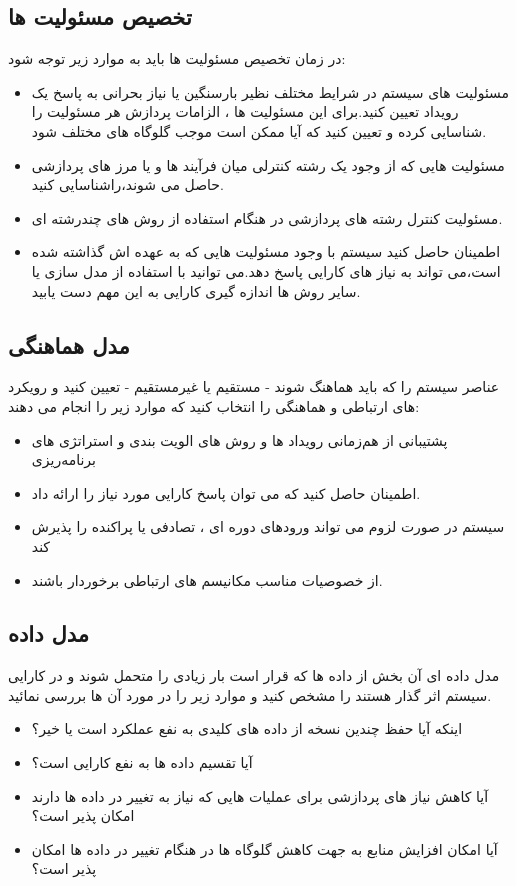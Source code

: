 \subsection{تخصیص مسئولیت ها} 
در زمان تخصیص مسئولیت ها باید  به موارد زیر توجه شود:
\begin{itemize}
\item
مسئولیت های سیستم در شرایط مختلف نظیر بارسنگین  یا نیاز بحرانی به پاسخ یک رویداد تعیین کنید.برای این مسئولیت ها ، الزامات پردازش هر مسئولیت را شناسایی کرده و تعیین کنید که آیا ممکن است موجب گلوگاه های مختلف شود.
\item
مسئولیت هایی که از وجود یک رشته کنترلی میان فرآیند ها و یا مرز های پردازشی حاصل می شوند،‌راشناسایی کنید.
\item
مسئولیت کنترل رشته های پردازشی در هنگام استفاده از روش های چند‌رشته ای.
\item
اطمینان حاصل کنید سیستم با وجود مسئولیت هایی که به عهده اش گذاشته شده است،‌می تواند به نیاز های کارایی پاسخ دهد.می توانید با استفاده از مدل سازی یا سایر روش ها اندازه گیری کارایی به این مهم دست یابید.
\end{itemize}
\subsection{مدل هماهنگی}
عناصر سیستم را که باید هماهنگ شوند - مستقیم یا غیرمستقیم - تعیین کنید و رویکرد های ارتباطی و هماهنگی را انتخاب کنید که موارد زیر را انجام می دهند:
\begin{itemize}
\item
پشتیبانی از هم‌زمانی رویداد ها و روش های الویت بندی و استراتژی های برنامه‌ریزی
\item
اطمینان حاصل کنید که می توان پاسخ کارایی مورد نیاز را ارائه داد.
\item
سیستم در صورت لزوم می تواند ورودهای دوره ای ، تصادفی یا پراکنده را پذیرش کند
\item
از خصوصیات مناسب مکانیسم های ارتباطی برخوردار باشند.
\end{itemize}
\subsection{مدل داده}
مدل داده   ای آن بخش از داده ها که قرار است بار زیادی را متحمل شوند و در کارایی سیستم اثر گذار هستند را مشخص کنید و موارد زیر را در مورد آن ها بررسی نمائید.
\begin{itemize}
\item
اینکه آیا حفظ چندین نسخه از داده های کلیدی به نفع عملکرد است یا خیر؟
\item
آیا تقسیم داده ها به نفع کارایی است؟
\item
آیا کاهش نیاز های پردازشی برای عملیات هایی که نیاز به تغییر در داده ها دارند امکان پذیر است؟
\item
آیا امکان افزایش منابع به جهت کاهش گلوگاه ها در هنگام تغییر در داده ها امکان پذیر است؟
\end{itemize}
